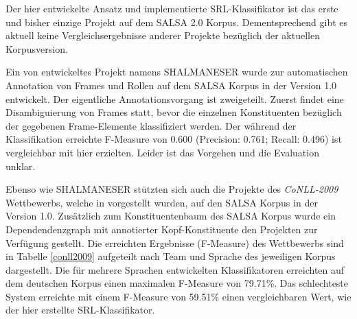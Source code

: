 \documentclass[12pt]{article}
\begin{document}
Der hier entwickelte Ansatz und implementierte SRL-Klassifikator ist das erste und bisher einzige Projekt auf dem SALSA 2.0 Korpus. Dementsprechend gibt es aktuell keine Vergleichsergebnisse anderer Projekte bezüglich der aktuellen Korpusversion.

Ein von \cite{erk2006shalmaneser} entwickeltes Projekt namens SHALMANESER wurde zur automatischen Annotation von Frames und Rollen auf dem SALSA Korpus in der Version 1.0 entwickelt. Der eigentliche Annotationsvorgang ist zweigeteilt. Zuerst findet eine Disambiguierung von Frames statt, bevor die einzelnen Konstituenten bezüglich der gegebenen Frame-Elemente klassifiziert werden. Der während der Klassifikation erreichte F-Measure von 0.600 (Precision: 0.761; Recall: 0.496) ist vergleichbar mit hier erzielten. Leider ist das Vorgehen und die Evaluation unklar.

Ebenso wie SHALMANESER stützten sich auch die Projekte des \textit{CoNLL-2009} Wettbewerbs, welche in \cite{hajivc2009conll} vorgestellt wurden, auf den SALSA Korpus in der Version 1.0. Zusätzlich zum Konstituentenbaum des SALSA Korpus wurde ein Dependendenzgraph mit annotierter Kopf-Konstituente den Projekten zur Verfügung gestellt. Die erreichten Ergebnisse (F-Measure) des Wettbewerbs sind in Tabelle \ref{conll2009} aufgeteilt nach Team und Sprache des jeweiligen Korpus dargestellt. Die für mehrere Sprachen entwickelten Klassifikatoren erreichten auf dem deutschen Korpus einen maximalen F-Measure von 79.71\%. Das schlechteste System erreichte mit einem F-Measure von 59.51\% einen vergleichbaren Wert, wie der hier erstellte SRL-Klassifikator.
\end{document}
